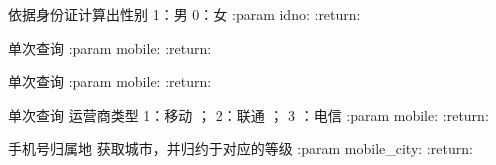\documentclass[letterpaper,10pt,english]{sphinxmanual}
\begin{document}
\begin{fulllineitems}
\label{\detokenize{CcxgetaddrTools:CcxgetaddrTools.getaddr.f_gender}}
依据身份证计算出性别 1：男  0：女
:param idno:
:return:

\end{fulllineitems}


\begin{fulllineitems}
\label{\detokenize{CcxgetaddrTools:CcxgetaddrTools.getaddr.f_get_mobile_city}}
单次查询
:param mobile:
:return:

\end{fulllineitems}


\begin{fulllineitems}
\label{\detokenize{CcxgetaddrTools:CcxgetaddrTools.getaddr.f_get_mobile_prov}}
单次查询
:param mobile:
:return:

\end{fulllineitems}


\begin{fulllineitems}
\label{\detokenize{CcxgetaddrTools:CcxgetaddrTools.getaddr.f_get_mobile_type}}
单次查询 运营商类型
1：移动  ； 2：联通 ；  3 ：电信
:param mobile:
:return:

\end{fulllineitems}


\begin{fulllineitems}
\label{\detokenize{CcxgetaddrTools:CcxgetaddrTools.getaddr.f_mobile_city_lvl}}
手机号归属地 获取城市，并归约于对应的等级
:param mobile\_city:
:return:

\end{fulllineitems}
\end{document}
